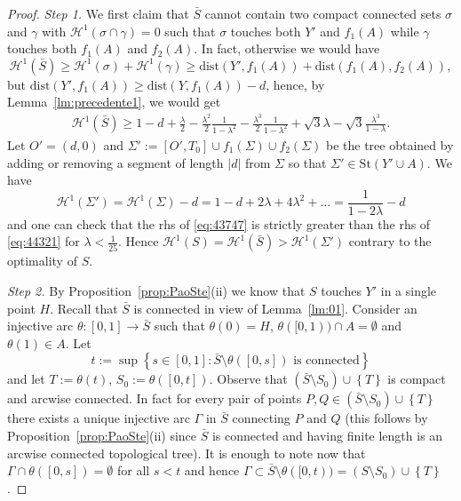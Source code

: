 \documentclass{amsart}
\renewcommand{\H}{\mathcal H}
\newcommand{\abs}[1]{\left\vert #1 \right\vert}
\newcommand{\ENCLOSE}[1]{\left\{#1\right\}}
\newcommand{\St}{\mathrm{St}}
\renewcommand{\H}{\mathcal{H}}
\newcommand{\dist}{\mathrm{dist}}
\theoremstyle{definition}
\theoremstyle{remark}
\begin{document}
\begin{proof}
  \emph{Step 1.}
  We first claim that $\bar S$ cannot contain 
  two compact connected sets 
  $\sigma$ and $\gamma$
  with $\H^1(\sigma\cap \gamma)=0$
  such that $\sigma$ touches both $Y'$ and $f_1(A)$ 
  while $\gamma$ touches both $f_1(A)$ and $f_2(A)$.
  In fact, otherwise we would have
  \[
    \H^1(\bar S)
    \ge \H^1(\sigma) + \H^1(\gamma)
    \ge \dist(Y', f_1(A)) + \dist(f_1(A), f_2(A)),
  \]
  but $\dist(Y', f_1(A)) \ge \dist(Y,f_1(A)) - d$,
  hence,
  by Lemma~\ref{lm:precedente1},
  we would get
  \begin{equation}
  \label{eq:43747}
  \begin{aligned}
    \H^1(\bar S)
    \ge 
    1 - d + \frac{\lambda} 2 
      - \frac{\lambda^2}{2}\frac{1}{1-\lambda^2}
      - \frac{\lambda^3}{2}\frac{1}{1-\lambda^2} 
     +
     \sqrt 3 \lambda - \sqrt 3 \frac{\lambda^3}{1-\lambda}.
  \end{aligned}
  \end{equation}
  Let $O'=(d,0)$ and $\Sigma':=[O',T_0] \cup f_1(\Sigma) \cup f_2(\Sigma)$ 
  be the tree obtained by adding or removing a segment of length 
  $\abs{d}$ from $\Sigma$ so that $\Sigma'\in \St(Y'\cup A)$.
  We have  
  \begin{equation}\label{eq:44321}
    \H^1(\Sigma')
    = \H^1(\Sigma) - d 
    = 1 - d + 2 \lambda + 4 \lambda^2 + \dots 
    = \frac{1}{1-2\lambda}-d
  \end{equation}
  and one can check that the rhs of \eqref{eq:43747} is
  strictly greater than the rhs of \eqref{eq:44321}
  for $\lambda < \frac 1 {25}$.
  Hence $\H^1(S) =\H^1(\bar S) > \H^1(\Sigma')$ contrary 
  to the optimality of $S$.
  
  \emph{Step 2.} 
  By Proposition~\ref{prop:PaoSte}(ii) we know that $S$ touches $Y'$ in a single point $H$.
  Recall that $\bar S$ is connected in view of Lemma~\ref{lm:01}.
  Consider an injective arc $\theta\colon[0,1]\to \bar S$ 
  such that $\theta(0)=H$, $\theta([0,1))\cap A=\emptyset$ 
  and $\theta(1)\in A$.  
  Let 
  \[
    t:= \sup\ENCLOSE{s\in[0,1]\colon \bar S\setminus \theta([0,s])
  \text{ is connected}}
  \] 
  and let $T:=\theta(t)$, $S_0:=\theta([0,t])$. 
  Observe that $(\bar S\setminus S_0)\cup \ENCLOSE{T}$ 
  is compact and arcwise connected.
  In fact for every pair of points $P,Q\in (\bar S\setminus S_0)\cup \ENCLOSE{T}$
  there exists a unique injective arc $\Gamma$ in $\bar S$ 
  connecting $P$ and $Q$ (this follows by Proposition~\ref{prop:PaoSte}(ii)
  since $\bar S$ is connected and having finite length 
  is an arcwise connected topological tree).
  It is enough to note now that 
  $\Gamma\cap \theta([0,s])=\emptyset$
  for all $s<t$ and hence 
  $\Gamma\subset \bar S\setminus \theta([0,t))
  = (S\setminus S_0)\cup\ENCLOSE{T}$.
  

\end{proof}
\end{document}
